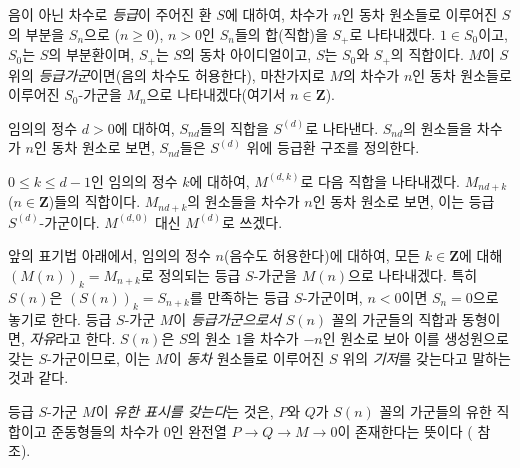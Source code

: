 \begin{notation}[2.1.1]
\label{II.2.1.1-ko}
음이 아닌 차수로 \emph{등급}이 주어진 환 $S$에 대하여,
차수가 $n$인 동차 원소들로 이루어진 $S$의 부분을 $S_n$으로
($n\geq0$), $n>0$인 $S_n$들의 합(직합)을 $S_+$로 나타내겠다.
$1\in S_0$이고, $S_0$는 $S$의 부분환이며, $S_+$는 $S$의 동차
아이디얼이고, $S$는 $S_0$와 $S_+$의 직합이다. $M$이 $S$ 위의
\emph{등급가군}이면(음의 차수도 허용한다), 마찬가지로
$M$의 차수가 $n$인 동차 원소들로 이루어진 $S_0$-가군을
$M_n$으로 나타내겠다(여기서 $n\in\mathbf{Z}$).

임의의 정수 $d>0$에 대하여, $S_{nd}$들의 직합을 $S^{(d)}$로
나타낸다. $S_{nd}$의 원소들을 차수가 $n$인 동차 원소로 보면,
$S_{nd}$들은 $S^{(d)}$ 위에 등급환 구조를 정의한다.

$0\leq k\leq d-1$인 임의의 정수 $k$에 대하여, $M^{(d,k)}$로
다음 직합을 나타내겠다.
$M_{nd+k}$ ($n\in\mathbf{Z}$)들의 직합이다.
$M_{nd+k}$의 원소들을 차수가 $n$인 동차 원소로 보면, 이는 등급
$S^{(d)}$-가군이다. $M^{(d,0)}$ 대신 $M^{(d)}$로 쓰겠다.

앞의 표기법 아래에서, 임의의 정수 $n$(음수도 허용한다)에 대하여,
모든 $k\in\mathbf{Z}$에 대해 $(M(n))_k=M_{n+k}$로 정의되는 등급
$S$-가군을 $M(n)$으로 나타내겠다. 특히 $S(n)$은
$(S(n))_k=S_{n+k}$를 만족하는 등급 $S$-가군이며,
$n<0$이면 $S_n=0$으로 놓기로 한다. 등급 $S$-가군 $M$이
\emph{등급가군으로서} $S(n)$ 꼴의 가군들의 직합과 동형이면,
\emph{자유}라고 한다. $S(n)$은 $S$의 원소 $1$을 차수가
$-n$인 원소로 보아 이를 생성원으로 갖는
$S$-가군이므로, 이는 $M$이 \emph{동차} 원소들로 이루어진
$S$ 위의 \emph{기저}를 갖는다고 말하는 것과 같다.

등급 $S$-가군 $M$이 \emph{유한 표시를 갖는다}는 것은, $P$와 $Q$가
$S(n)$ 꼴의 가군들의 유한 직합이고 준동형들의 차수가 $0$인 완전열
$P\to Q\to M\to0$이 존재한다는 뜻이다
( 참조).
\end{notation}

